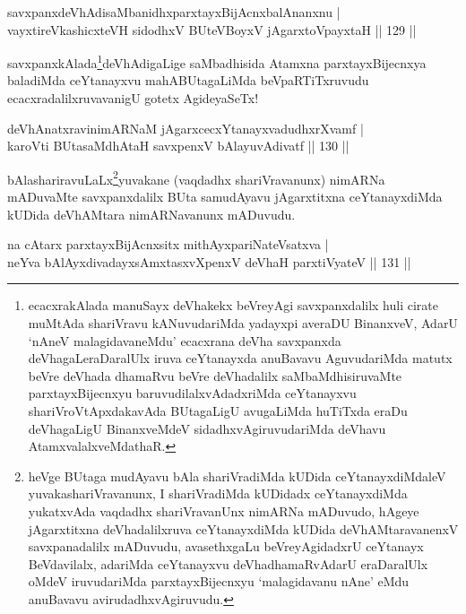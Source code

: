 \begin{shl}
savxpanxdeVhAdisaMbanidhxparxtayxBijAcnxbalAnanxnu | \\
vayxtireVkashicxteVH sidodhxV BUteVBoyxV jAgarxtoV\s payxtaH \hfill||  129 ||  
\end{shl}

\begin{artha}
savxpanxkAlada\footnote{ecacxrakAlada manuSayx deVhakekx beVreyAgi savxpanxdalilx huli cirate muMtAda shariVravu kANuvudariMda yadayxpi  averaDU BinanxveV, AdarU `nAneV malagidavaneMdu' ecacxrana deVha savxpanxda deVhagaLeraDaralUlx iruva ceYtanayxda anuBavavu AguvudariMda matutx beVre deVhada dhamaRvu beVre deVhadalilx saMbaMdhisiruvaMte parxtayxBijecnxyu baruvudilalxvAdadxriMda ceYtanayxvu shariVroVtApxdakavAda BUtagaLigU avugaLiMda huTiTxda eraDu deVhagaLigU BinanxveMdeV sidadhxvAgiruvudariMda deVhavu AtamxvalalxveMdathaR.}deVhAdigaLige saMbadhisida Atamxna parxtayxBijecnxya baladiMda ceYtanayxvu mahABUtagaLiMda beVpaRTiTxruvudu ecacxradalilxruvavanigU gotetx AgideyaSeTx!
\end{artha}


\begin{shl}
deVhAnatxravinimARNaM jAgarxcecxYtanayxvadudhxrXvamf | \\
karoVti BUtasaMdhAtaH savxpenxV bAlayuvAdivatf \hfill||  130 ||  
\end{shl}

\begin{artha}
bAlashariravuLaLx\footnote{heVge BUtaga mudAyavu bAla shariVradiMda kUDida ceYtanayxdiMdaleV yuvakashariVravanunx, I shariVradiMda kUDidadx ceYtanayxdiMda yukatxvAda vaqdadhx shariVravanUnx nimARNa mADuvudo, hAgeye jAgarxtitxna deVhadalilxruva ceYtanayxdiMda kUDida deVhAMtaravanenxV savxpanadalilx mADuvudu, avasethxgaLu beVreyAgidadxrU ceYtanayx BeVdavilalx, adariMda ceYtanayxvu deVhadhamaRvAdarU eraDaralUlx oMdeV iruvudariMda parxtayxBijecnxyu `malagidavanu nAne' eMdu anuBavavu avirudadhxvAgiruvudu.}yuvakane (vaqdadhx shariVravanunx) nimARNa mADuvaMte savxpanxdalilx BUta samudAyavu jAgarxtitxna ceYtanayxdiMda kUDida deVhAMtara nimARNavanunx mADuvudu.
\end{artha}

\begin{shl}
na cAtarx parxtayxBijAcnx\s sitx mithAyxpariNateVsatxva | \\
neYva bAlAyxdivadayxsAmxtasxvXpenxV deVhaH parxtiVyateV \hfill||  131 ||  
\end{shl}

